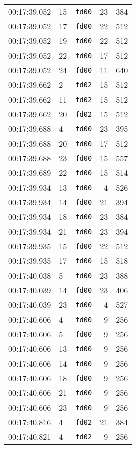 \documentclass{article}
\begin{document}
\begin{longtable}{lllrr}
00:17:39.052 & 15 & \texttt{fd00} & 23 & 384 \\
00:17:39.052 & 17 & \texttt{fd00} & 22 & 512 \\
00:17:39.052 & 19 & \texttt{fd00} & 22 & 512 \\
00:17:39.052 & 22 & \texttt{fd00} & 17 & 512 \\
00:17:39.052 & 24 & \texttt{fd00} & 11 & 640 \\
00:17:39.662 & 2 & \texttt{fd02} & 15 & 512 \\
00:17:39.662 & 11 & \texttt{fd02} & 15 & 512 \\
00:17:39.662 & 20 & \texttt{fd02} & 15 & 512 \\
00:17:39.688 & 4 & \texttt{fd00} & 23 & 395 \\
00:17:39.688 & 20 & \texttt{fd00} & 17 & 512 \\
00:17:39.688 & 23 & \texttt{fd00} & 15 & 557 \\
00:17:39.689 & 22 & \texttt{fd00} & 15 & 514 \\
00:17:39.934 & 13 & \texttt{fd00} & 4 & 526 \\
00:17:39.934 & 14 & \texttt{fd00} & 21 & 394 \\
00:17:39.934 & 18 & \texttt{fd00} & 23 & 384 \\
00:17:39.934 & 21 & \texttt{fd00} & 23 & 394 \\
00:17:39.935 & 15 & \texttt{fd00} & 22 & 512 \\
00:17:39.935 & 17 & \texttt{fd00} & 15 & 518 \\
00:17:40.038 & 5 & \texttt{fd00} & 23 & 388 \\
00:17:40.039 & 14 & \texttt{fd00} & 23 & 406 \\
00:17:40.039 & 23 & \texttt{fd00} & 4 & 527 \\
00:17:40.606 & 4 & \texttt{fd00} & 9 & 256 \\
00:17:40.606 & 5 & \texttt{fd00} & 9 & 256 \\
00:17:40.606 & 13 & \texttt{fd00} & 9 & 256 \\
00:17:40.606 & 14 & \texttt{fd00} & 9 & 256 \\
00:17:40.606 & 18 & \texttt{fd00} & 9 & 256 \\
00:17:40.606 & 21 & \texttt{fd00} & 9 & 256 \\
00:17:40.606 & 23 & \texttt{fd00} & 9 & 256 \\
00:17:40.816 & 4 & \texttt{fd02} & 21 & 384 \\
00:17:40.821 & 4 & \texttt{fd02} & 9 & 256 \\

\end{longtable}
\end{document}
